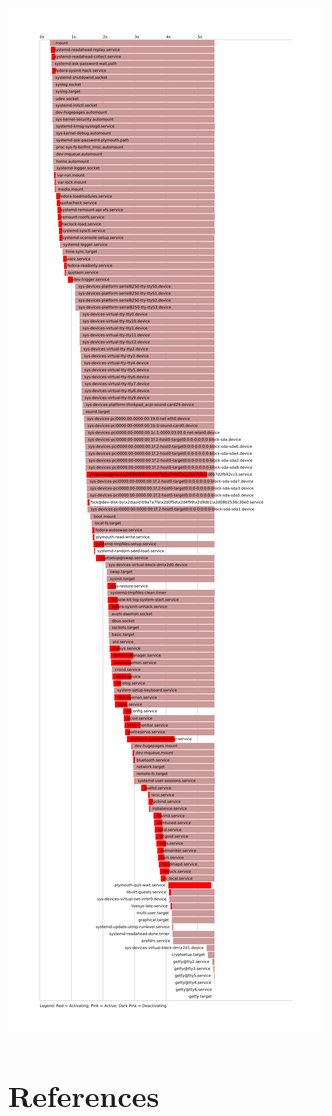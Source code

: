 \documentclass[titlepage]{article}
\begin{document}
\includegraphics[scale=0.1]{blame2.png}
\section{References}
\nocite{*}


\end{document}
